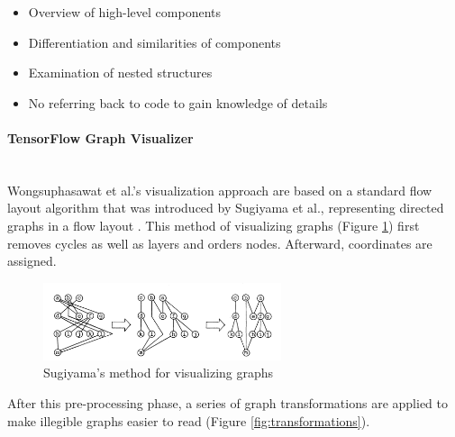 \documentclass{acmsiggraph}               %
\newcommand{\paragraphbr}[1]{\paragraph{#1}\mbox{}\\}
\begin{document}
\begin{itemize}
  \setlength\itemsep{0em}
  \item Overview of high-level components
  \item Differentiation and similarities of components
  \item Examination of nested structures
  \item No referring back to code to gain knowledge of details
\end{itemize}

\paragraphbr{TensorFlow Graph Visualizer}

Wongsuphasawat et al.'s visualization approach are based on a standard flow layout algorithm that was introduced by Sugiyama et al., representing directed graphs in a flow layout \cite{Sugiyama1981}. This method of visualizing graphs (Figure \ref{fig:sugiyama_method}) first removes cycles as well as layers and orders nodes. Afterward, coordinates are assigned.

\begin{figure}[H]
\includegraphics[width=2.75in]{sugiyama_method_sugiyama_et_al}
\caption{Sugiyama's method for visualizing graphs \protect\cite{Sugiyama1981}}
\label{fig:sugiyama_method}
\centering
\end{figure}

After this pre-processing phase, a series of graph transformations are applied to make illegible graphs easier to read (Figure \ref{fig:transformations}). \\
\end{document}
